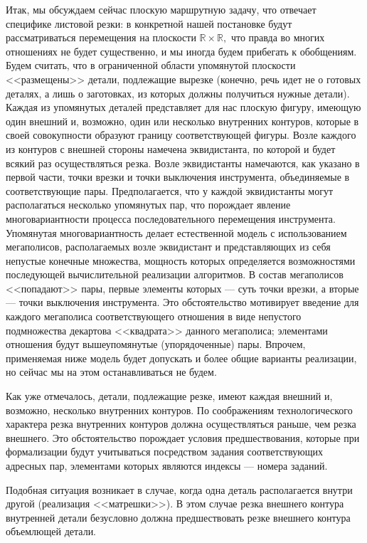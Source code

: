 \documentclass[11pt,twoside,openany]{report}
\newcommand{\bbr}{{\mathbb R}}
\begin{document}
Итак, мы обсуждаем сейчас плоскую маршрутную задачу,
что отвечает специфике
листовой резки:
в конкретной нашей постановке будут рассматриваться перемещения на плоскости
$\bbr \times \bbr,$
что правда во многих отношениях не будет существенно,
и мы иногда будем прибегать к обобщениям.
Будем считать, что в
ограниченной области упомянутой плоскости <<размещены>> детали,
подлежащие вырезке
(конечно, речь идет не о готовых деталях,
а лишь о заготовках, из которых должны
получиться нужные детали).
Каждая из упомянутых деталей представляет для нас
плоскую фигуру,
имеющую один внешний и, возможно, один или несколько внутренних
контуров, которые в своей совокупности образуют границу соответствующей фигуры.
Возле каждого из контуров с внешней стороны намечена эквидистанта,
по которой и
будет всякий раз осуществляться резка.
Возле эквидистанты намечаются,
как указано в первой части,
точки врезки и точки выключения инструмента,
объединяемые в соответствующие пары.
Предполагается, что у каждой эквидистанты могут располагаться
несколько упомянутых пар,
что порождает явление многовариантности процесса
последовательного перемещения инструмента.
Упомянутая многовариантность делает
естественной модель с использованием мегаполисов,
располагаемых возле эквидистант
и представляющих из себя непустые конечные множества,
мощность которых определяется
возможностями последующей вычислительной реализации алгоритмов.
В состав мегаполисов
<<попадают>> пары, первые элементы которых --- суть точки врезки,
а вторые --- точки выключения инструмента.
Это обстоятельство мотивирует введение для каждого мегаполиса
соответствующего отношения в виде
непустого подмножества декартова <<квадрата>> данного мегаполиса;
элементами отношения будут вышеупомянутые (упорядоченные) пары.
Впрочем,
применяемая ниже модель будет допускать
и более общие варианты реализации, но сейчас
мы на этом останавливаться не будем.

Как уже отмечалось, детали, подлежащие резке,
имеют каждая внешний и, возможно,
несколько внутренних контуров.
По соображениям технологического характера резка
внутренних контуров должна осуществляться раньше,
чем резка внешнего.
Это обстоятельство порождает условия предшествования,
которые при формализации
будут учитываться посредством задания
соответствующих адресных пар,
элементами которых являются индексы --- номера заданий.

Подобная ситуация возникает в случае,
когда одна деталь располагается внутри
другой (реализация <<матрешки>>).
В этом случае резка внешнего контура внутренней
детали безусловно должна предшествовать
резке внешнего контура объемлющей детали.
\end{document}
